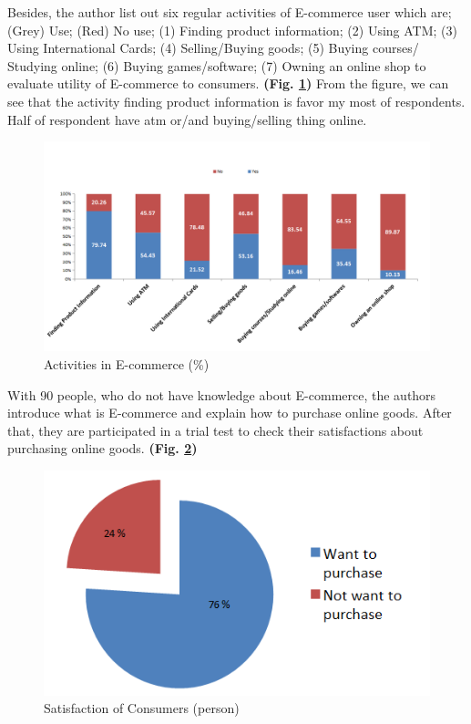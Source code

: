 \documentclass[conference]{IEEEtran}
\begin{document}
Besides, the author list out six regular activities of E-commerce user which are; (Grey) Use; (Red) No use; (1) Finding product information; (2) Using ATM; (3) Using International Cards; (4) Selling/Buying goods; (5) Buying courses/ Studying online; (6) Buying games/software; (7) Owning an online shop to evaluate utility of E-commerce to consumers. \textbf{(Fig. \ref{fig:ecactivities})} From the figure, we can see that the activity finding product information is favor my most of respondents. Half of respondent have atm or/and buying/selling thing online.   

\begin{figure}[tbph]
\centering
\includegraphics[width=0.7\linewidth]{./ecactivities}
\caption{Activities in E-commerce (\%)}
\label{fig:ecactivities}
\end{figure}



With 90 people, who do not have knowledge about E-commerce, the authors introduce what is E-commerce and explain how to purchase online goods. After that, they are participated in a trial test to check their satisfactions about purchasing online goods. \textbf{(Fig. \ref{fig:satisfaction})}

\begin{figure}[h]
\centering
\includegraphics[width=0.7\linewidth]{./satisfaction}
\caption{Satisfaction of Consumers (person)}
\label{fig:satisfaction}
\end{figure}
\end{document}
